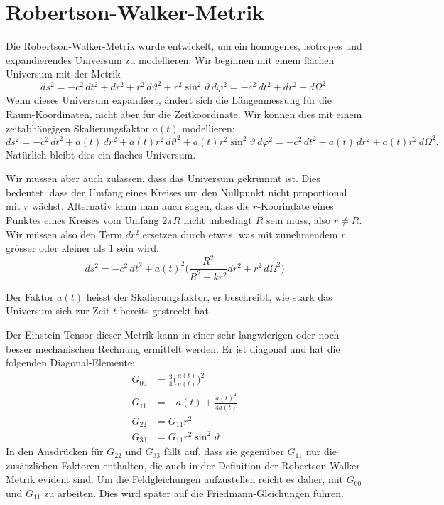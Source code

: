 %
%
%
\chapter{Robertson-Walker-Metrik%
\label{skript:chapter:robertson}}
\rhead{}
Die Robertson-Walker-Metrik wurde entwickelt, um ein homogenes,
isotropes und expandierendes Universum zu modellieren.
Wir beginnen mit einem flachen Universum mit der
Metrik
\[
ds^2
=
-c^2\,dt^2 + dr^2 + r^2\,d\vartheta^2 + r^2\sin^2\vartheta \,d\varphi^2
=
-c^2\,dt^2 + dr^2 + d\Omega^2.
\]
Wenn dieses Universum expandiert, ändert sich die Längenmessung für die
Raum-Koordinaten, nicht aber für die Zeitkoordinate.
Wir können dies mit einem zeitabhängigen Skalierungsfaktor $a(t)$ 
modellieren:
\[
ds^2
=
-c^2\,dt^2 + a(t)\,dr^2 + a(t)r^2\,d\vartheta^2 + a(t)r^2 \sin^2\vartheta\,d\varphi^2
=
-c^2\,dt^2 + a(t)\,dr^2 + a(t)r^2\,d\Omega^2.
\]
Natürlich bleibt dies ein flaches Universum.

Wir müssen aber auch zulassen, dass das Universum gekrümmt ist.
Dies bedeutet, dass der Umfang eines Kreises um den Nullpunkt
nicht proportional mit $r$ wächst.
Alternativ kann man auch sagen, dass die $r$-Koorindate eines Punktes 
eines Kreises vom Umfang $2\pi R$ nicht unbedingt $R$ sein muss, also
$r \ne R$.
Wir müssen also den Term $dr^2$ ersetzen durch etwas, was mit zunehmendem
$r$ grösser oder kleiner als $1$ sein wird.
\[
ds^2
=
-c^2\,dt^2
+ a(t)^2 \biggl(
\frac{R^2}{R^2-kr^2} dr^2
+
r^2\, d\Omega^2
\biggr)
\]

Der Faktor $a(t)$ heisst der Skalierungsfaktor, er beschreibt, wie stark
das Universum sich zur Zeit $t$ bereits gestreckt hat.

Der Einstein-Tensor dieser Metrik kann in einer sehr langwierigen oder
noch besser mechanischen Rechnung ermittelt werden.
Er ist diagonal und hat die folgenden Diagonal-Elemente:
\begin{align*}
G_{00}
&=
\frac{3}{4}\biggl(\frac{\dot a(t)}{a(t)}\biggr)^2
\\
G_{11}
&=
-\ddot a(t) +\frac{\dot a(t)^2}{4a(t)}
\\
G_{22}
&=
G_{11} r^2
\\
G_{33}
&=
G_{11} r^2\sin^2\vartheta
\end{align*}
In den Ausdrücken für $G_{22}$ und $G_{33}$ fällt auf, dass sie gegenüber
$G_{11}$ nur die zusätzlichen Faktoren enthalten, die auch in der Definition
der Robertson-Walker-Metrik evident sind.
Um die Feldgleichungen aufzustellen reicht es daher, mit $G_{00}$ und
$G_{11}$ zu arbeiten.
Dies wird später auf die Friedmann-Gleichungen führen.



